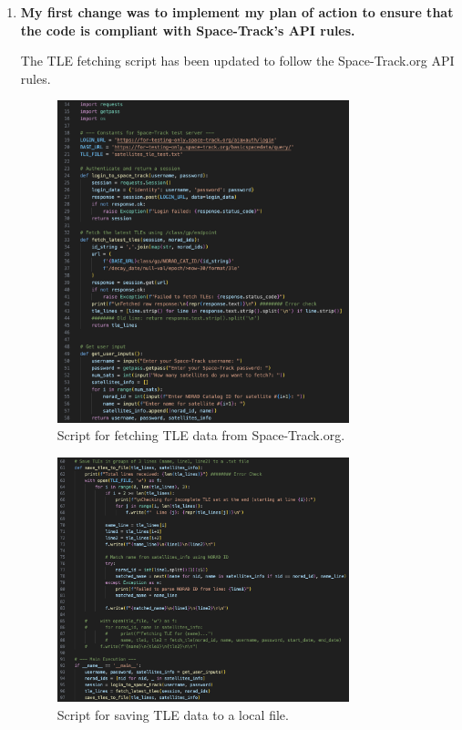 \documentclass[12pt]{report}
\begin{document}
\begin{enumerate}
  
  \item \textbf{My first change was to implement my plan of action to ensure that the code is compliant with Space-Track’s API rules.}
  
    The TLE fetching script has been updated to follow the Space-Track.org API rules.

    \begin{figure}[H]
      \centering
      \includegraphics[width=0.8\textwidth]{figure_week_7_fetch1.png}
      \caption{Script for fetching TLE data from Space-Track.org.}
      \label{fig:fetch-tle-data1}
    \end{figure}

    \begin{figure}[H]
      \centering
      \includegraphics[width=0.8\textwidth]{figure_week_7_fetch2.png}
      \caption{Script for saving TLE data to a local file.}
      \label{fig:fetch-tle-data2}
    \end{figure}


\end{enumerate}
\end{document}
